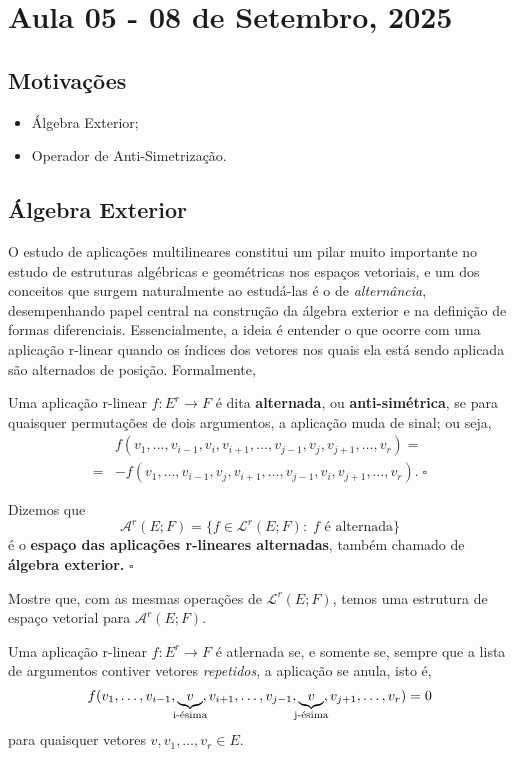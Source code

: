 \documentclass[../differential_forms.tex]{subfiles}
\begin{document}
\section{Aula 05 - 08 de Setembro, 2025}
\subsection{Motivações}
\begin{itemize}
	\item Álgebra Exterior;
	\item Operador de Anti-Simetrização.
\end{itemize}
\subsection{Álgebra Exterior}
O estudo de aplicações multilineares constitui um pilar muito importante no estudo de estruturas algébricas e geométricas nos espaços vetoriais,
e um dos conceitos que surgem naturalmente ao estudá-las é o de \textit{alternância}, desempenhando papel central na construção da álgebra
exterior e na definição de formas diferenciais. Essencialmente, a ideia é entender o que ocorre com uma aplicação r-linear quando os índices
dos vetores nos quais ela está sendo aplicada são alternados de posição. Formalmente,
\begin{def*}
	Uma aplicação r-linear \(f:E^{r}\rightarrow F\) é dita \textbf{alternada}, ou \textbf{anti-simétrica}, se para quaisquer permutações de dois argumentos, a aplicação muda de sinal; ou seja,
	\begin{align*}
		  & f(v_1, \dotsc , v_{i-1}, v_{i}, v_{i+1}, \dotsc , v_{j-1}, v_{j}, v_{j+1}, \dotsc , v_r) =          \\
		= & -f(v_1,\dotsc , v_{i-1}, v_{j}, v_{i+1}, \dotsc , v_{j-1}, v_{i}, v_{j+1}, \dotsc , v_r).\; \square
	\end{align*}
\end{def*}
\begin{def*}
	Dizemos que
	\[
		\mathcal{A}^{r}(E; F)=\{f\in \mathcal{L}^{r}(E; F):\; f \text{ é alternada}\}
	\]
	é o \textbf{espaço das aplicações r-lineares alternadas}, também chamado de \textbf{álgebra exterior.} \(\square\)
\end{def*}
\begin{exr}
	Mostre que, com as mesmas operações de \(\mathcal{L}^{r}(E; F)\), temos uma estrutura de espaço vetorial para \(\mathcal{A}^{r}(E; F).\)
\end{exr}
\begin{prop*}
	Uma aplicação r-linear \(f:E^{r}\rightarrow F\) é atlernada se, e somente se, sempre que a lista de argumentos contiver vetores
	\textit{repetidos}, a aplicação se anula, isto é,
	\[
		f(v_1, \dotsc , v_{i-1}, \underbrace{v}_{\mathclap{\text{i-ésima}}}, v_{i+1}, \dotsc , v_{j-1}, \underbrace{v}_{\mathclap{\text{j-ésima}}}, v_{j+1}, \dotsc , v_r) = 0
	\]
	para quaisquer vetores \(v, v_1, \dotsc , v_r\in E.\)
\end{prop*}
\end{document}
